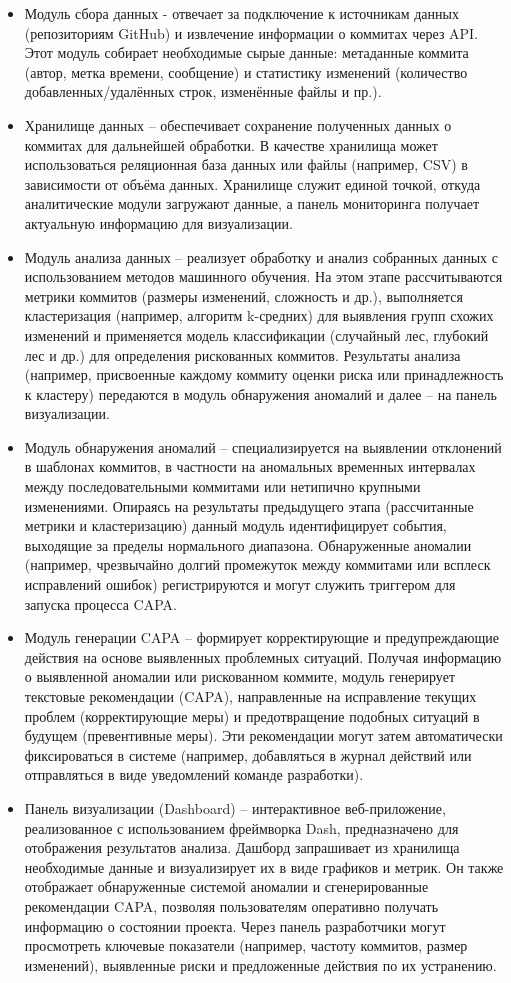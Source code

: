 \begin{itemize}
	\item Модуль сбора данных - отвечает за подключение к источникам данных (репозиториям GitHub) и извлечение информации о коммитах через API. Этот модуль собирает необходимые сырые данные: метаданные коммита (автор, метка времени, сообщение) и статистику изменений (количество добавленных/удалённых строк, изменённые файлы и пр.).
	\item Хранилище данных – обеспечивает сохранение полученных данных о коммитах для дальнейшей обработки. В качестве хранилища может использоваться реляционная база данных или файлы (например, CSV) в зависимости от объёма данных. Хранилище служит единой точкой, откуда аналитические модули загружают данные, а панель мониторинга получает актуальную информацию для визуализации.
	\item Модуль анализа данных – реализует обработку и анализ собранных данных с использованием методов машинного обучения. На этом этапе рассчитываются метрики коммитов (размеры изменений, сложность и др.), выполняется кластеризация (например, алгоритм k-средних) для выявления групп схожих изменений и применяется модель классификации (случайный лес, глубокий лес и др.) для определения рискованных коммитов. Результаты анализа (например, присвоенные каждому коммиту оценки риска или принадлежность к кластеру) передаются в модуль обнаружения аномалий и далее – на панель визуализации.
	\item Модуль обнаружения аномалий – специализируется на выявлении отклонений в шаблонах коммитов, в частности на аномальных временных интервалах между последовательными коммитами или нетипично крупными изменениями. Опираясь на результаты предыдущего этапа (рассчитанные метрики и кластеризацию) данный модуль идентифицирует события, выходящие за пределы нормального диапазона. Обнаруженные аномалии (например, чрезвычайно долгий промежуток между коммитами или всплеск исправлений ошибок) регистрируются и могут служить триггером для запуска процесса CAPA.
	\item Модуль генерации CAPA – формирует корректирующие и предупреждающие действия на основе выявленных проблемных ситуаций. Получая информацию о выявленной аномалии или рискованном коммите, модуль генерирует текстовые рекомендации (CAPA), направленные на исправление текущих проблем (корректирующие меры) и предотвращение подобных ситуаций в будущем (превентивные меры). Эти рекомендации могут затем автоматически фиксироваться в системе (например, добавляться в журнал действий или отправляться в виде уведомлений команде разработки).
	\item Панель визуализации (Dashboard) – интерактивное веб-приложение, реализованное с использованием фреймворка Dash, предназначено для отображения результатов анализа. Дашборд запрашивает из хранилища необходимые данные и визуализирует их в виде графиков и метрик. Он также отображает обнаруженные системой аномалии и сгенерированные рекомендации CAPA, позволяя пользователям оперативно получать информацию о состоянии проекта. Через панель разработчики могут просмотреть ключевые показатели (например, частоту коммитов, размер изменений), выявленные риски и предложенные действия по их устранению.
\end{itemize}

